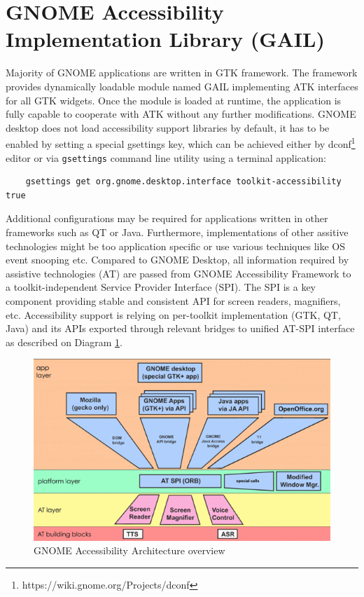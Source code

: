 \section{GNOME Accessibility Implementation Library (GAIL)}
Majority of GNOME applications are written in GTK framework. The framework provides dynamically loadable module named GAIL implementing ATK interfaces for all GTK widgets. Once the module is loaded at runtime, the application is fully capable to cooperate with ATK without any further modifications.
GNOME desktop does not load accessibility support libraries by default, it has to be enabled by setting a special gsettings key, which can be achieved either by dconf\footnote{https://wiki.gnome.org/Projects/dconf} editor or via \texttt{gsettings} command line utility using a terminal application:
\begin{verbatim}
    gsettings get org.gnome.desktop.interface toolkit-accessibility true
\end{verbatim}
Additional configurations may be required for applications written in other frameworks such as QT or Java. Furthermore, implementations of other assitive technologies might be too application specific or use various techniques like OS event snooping etc. Compared to GNOME Desktop, all information required by assistive technologies (AT) are passed from GNOME Accessibility Framework to a toolkit-independent Service Provider Interface (SPI). The SPI is a key component providing stable and consistent API for screen readers, magnifiers, etc. Accessibility support is relying on per-toolkit implementation (GTK, QT, Java) and its APIs exported through relevant bridges to unified AT-SPI interface as described on Diagram \ref{ATSPI_architecture}.

\begin{figure}[hbt]
	\centering
	\includegraphics[width=1\textwidth]{obrazky-figures/GNOME_desktop_Accessibility.png}
	\caption{GNOME Accessibility Architecture overview\cite{gnomeADG}}
	\label{ATSPI_architecture}
\end{figure}

